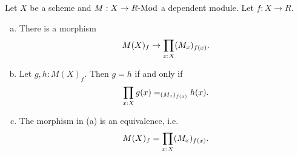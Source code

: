 \begin{lemma}%
  \label{module-bundle-localization-pointwise}
  Let $X$ be a scheme and $M:X\to R\text{-}\mathrm{Mod}$ a dependent module.
  Let $f:X\to R$.
  \begin{enumerate}[(a)]
  \item There is a morphism
    \[
      M(X)_f\to \prod_{x:X}(M_x)_{f(x)}
      \rlap{.}
    \]
  \item Let $g,h:M(X)_f$. Then $g=h$ if and only if
    \[
      \prod_{x:X}g(x)=_{(M_x)_{f(x)}}h(x)
      \rlap{.}
    \]
  \item The morphism in (a) is an equivalence, i.e.
    \[
      M(X)_f=\prod_{x:X}(M_x)_{f(x)}
      \rlap{.}
    \]
  \end{enumerate}
\end{lemma}

